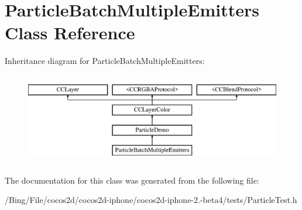 \hypertarget{interface_particle_batch_multiple_emitters}{\section{Particle\-Batch\-Multiple\-Emitters Class Reference}
\label{interface_particle_batch_multiple_emitters}
}
Inheritance diagram for Particle\-Batch\-Multiple\-Emitters\-:\begin{figure}[H]
\begin{center}
\leavevmode
\includegraphics[height=4.000000cm]{interface_particle_batch_multiple_emitters}
\end{center}
\end{figure}


The documentation for this class was generated from the following file\-:\begin{DoxyCompactItemize}
\item 
/\-Bing/\-File/cocos2d/cocos2d-\/iphone/cocos2d-\/iphone-\/2.-\/beta4/tests/Particle\-Test.\-h\end{DoxyCompactItemize}
